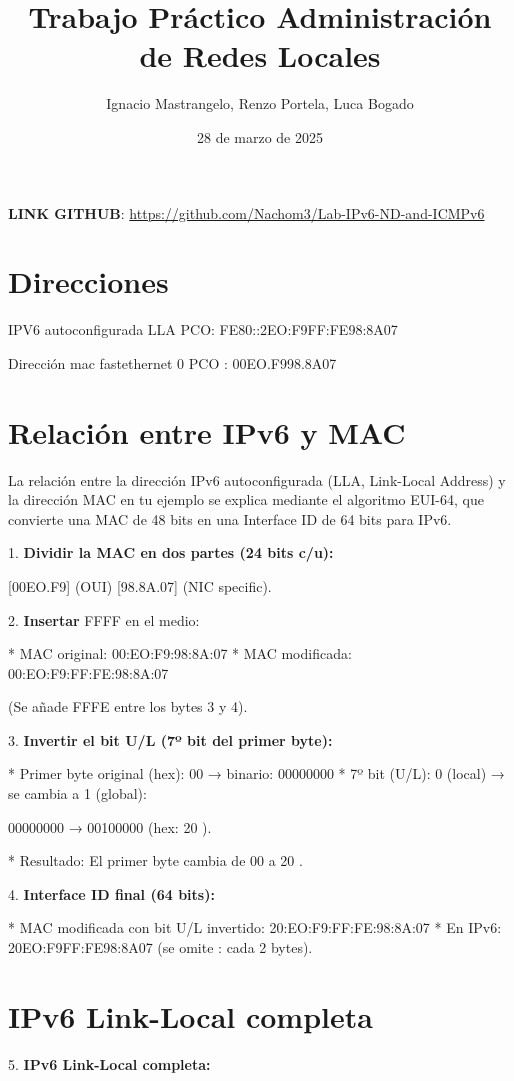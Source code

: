 \documentclass{article}
\title{Trabajo Práctico
Administración de Redes Locales}
\author{Ignacio Mastrangelo, Renzo Portela, Luca Bogado}
\date{28 de marzo de 2025}
\begin{document}
\maketitle
\begin{center}
    \textbf{LINK GITHUB}: \url{https://github.com/Nachom3/Lab-IPv6-ND-and-ICMPv6}  
\end{center}





\section*{Direcciones}
IPV6 autoconfigurada LLA PCO: FE80::2EO:F9FF:FE98:8A07

Dirección mac fastethernet 0 PCO : 00EO.F998.8A07

\section*{Relación entre IPv6 y MAC}
La relación entre la dirección IPv6 autoconfigurada (LLA, Link-Local Address) y la dirección MAC en tu ejemplo se explica mediante el algoritmo EUI-64, que convierte una MAC de 48 bits en una Interface ID de 64 bits para IPv6.

1. \textbf{Dividir la MAC en dos partes (24 bits c/u):}

   [00EO.F9] (OUI)  
   [98.8A.07] (NIC specific).

2. \textbf{Insertar} FFFF en el medio:

   * MAC original: 00:EO:F9:98:8A:07
   * MAC modificada: 00:EO:F9:FF:FE:98:8A:07

   (Se añade  FFFE  entre los bytes 3 y 4).

3. \textbf{Invertir el bit U/L (7º bit del primer byte):}

   * Primer byte original (hex): 00 → binario: 00000000
   * 7º bit (U/L): 0 (local) → se cambia a 1 (global):

    00000000 → 00100000 (hex: 20 ).

   * Resultado: El primer byte cambia de 00 a 20 .

4. \textbf{Interface ID final (64 bits):}

   * MAC modificada con bit U/L invertido: 20:EO:F9:FF:FE:98:8A:07
   * En IPv6: 20EO:F9FF:FE98:8A07 (se omite : cada 2 bytes).

\section*{IPv6 Link-Local completa}
5. \textbf{IPv6 Link-Local completa:}
\end{document}
